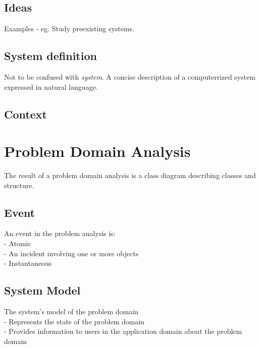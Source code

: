 \subsection*{Ideas}
Examples - eg. Study preexisting systems.

\subsection*{System definition}
Not to be confused with \textit{system}. A concise description of a computerrized system expressed in natural language.

\subsection*{Context}

\section{Problem Domain Analysis}
The result of a problem domain analysis is a class diagram describing classes and structure.

\subsection*{Event}
An event in the problem analysis is:\\
 - Atomic\\
 - An incident involving one or more objects\\
 - Instantaneous\\

 \subsection*{System Model}
 The system's model of the problem domain\\
 - Represents the state of the problem domain\\
 - Provides information to users in the application domain about the problem domain\\
 